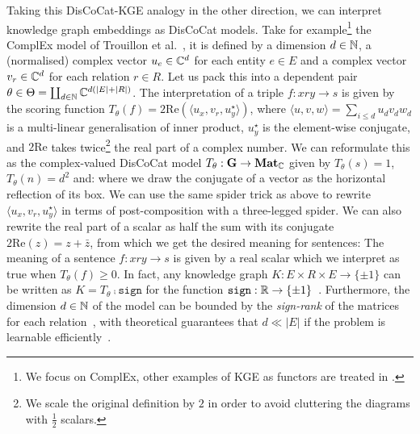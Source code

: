 Taking this DisCoCat-KGE analogy in the other direction, we can interpret knowledge graph embeddings as DisCoCat models.
Take for example\footnote
{We focus on ComplEx, other examples of KGE as functors are treated in \cite[Section~2.6]{Felice22}.}
the ComplEx model of Trouillon et al.~\cite{TrouillonEtAl16,TrouillonEtAl17}, it is defined by a dimension $d \in \mathbb{N}$, a (normalised) complex vector $u_e \in \mathbb{C}^d$ for each entity $e \in E$ and a complex vector $v_r \in \mathbb{C}^d$ for each relation $r \in R$.
Let us pack this into a dependent pair $\theta \in \Theta = \coprod_{d \in \mathbb{N}} \mathbb{C}^{d (\vert E \vert + \vert R \vert)}$.
The interpretation of a triple $f : x r y \to s$ is given by the scoring function $T_\theta(f) = 2 \text{Re}(\langle u_x, v_r, u_y^\star \rangle)$, where $\langle u, v, w \rangle = \sum_{i \leq d} u_d v_d w_d$ is a multi-linear generalisation of inner product, $u_y^\star$ is the element-wise conjugate, and $2 \text{Re}$ takes twice\footnote
{We scale the original definition by $2$ in order to avoid cluttering the diagrams with $\frac{1}{2}$ scalars.} the real part of a complex number.
We can reformulate this as the complex-valued DisCoCat model $T_\theta : \mathbf{G} \to \mathbf{Mat}_{\mathbb{C}}$ given by $T_\theta(s) = 1$, $T_\theta(n) = d^2$ and:
where we draw the conjugate of a vector as the horizontal reflection of its box.
We can use the same spider trick as above to rewrite $\langle u_x, v_r, u_y^\star \rangle$ in terms of post-composition with a three-legged spider.
We can also rewrite the real part of a scalar as half the sum with its conjugate $2 \text{Re}(z) = z + \bar z$, from which we get the desired meaning for sentences:
The meaning of a sentence $f : x r y \to s$ is given by a real scalar which we interpret as true when $T_\theta(f) \geq 0$.
In fact, any knowledge graph $K : E \times R \times E \to \{ \pm 1 \}$ can be written as $K = T_\theta \fcmp \mathtt{sign}$ for the function $\mathtt{sign} : \mathbb{R} \to \{ \pm 1 \}$~\cite[Theorem~4]{TrouillonEtAl17}.
Furthermore, the dimension $d \in \mathbb{N}$ of the model can be bounded by the \emph{sign-rank} of the matrices for each relation~\cite[Proposition~2.5.17]{Felice22}, with theoretical guarantees that $d \ll \vert E \vert$ if the problem is learnable efficiently~\cite{AlonEtAl16a}.

